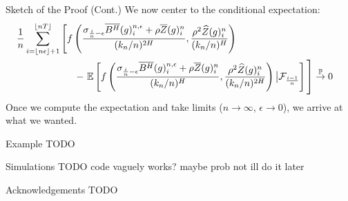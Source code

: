 \documentclass[final,hyperref={pdfpagelabels=false}]{beamer}
\newcommand{\E}{\mathbb{E}}
\begin{document}
\begin{frame}{}
\begin{columns}[t]
      \begin{column}{0.28\linewidth}
        \begin{block}{Sketch of the Proof (Cont.)}
          We now center to the conditional expectation:
          \begin{align*}
            \phantom{}
    &\begin{aligned}
      &\frac{1}{n}\sum_{i = \left\lfloor n\epsilon \right\rfloor + 1}^{\left\lfloor nT \right\rfloor} \left[ \vphantom{\E \left[ f\left( \frac{\sigma_{\frac{i}{n}-\epsilon}\overline{B^H}(g)^{n,\epsilon}_i + \rho\overline{Z}(g)^n_i}{(k_n/n)^{2H}}, \frac{\rho^2\widehat{Z}(g)^n_i}{(k_n/n)^H}\right) \right] } f\left( \frac{\sigma_{\frac{i}{n}-\epsilon}\overline{B^H}(g)^{n,\epsilon}_i + \rho\overline{Z}(g)^n_i}{(k_n/n)^{2H}}, \frac{\rho^2\widehat{Z}(g)^n_i}{(k_n/n)^H}\right) \right. \\ &\hspace*{2.1cm} - \left. \E\left[ f\left( \frac{\sigma_{\frac{i}{n}-\epsilon}\overline{B^H}(g)^{n,\epsilon}_i + \rho\overline{Z}(g)^n_i}{(k_n/n)^{H}}, \frac{\rho^2\widehat{Z}(g)^n_i}{(k_n/n)^{2H}}\right) \big| \mathcal{F}_{\frac{i-1}{n}} \right] \vphantom{\frac{1}{n}\sum_{i = \left\lfloor n\epsilon \right\rfloor + 1}^{\left\lfloor nT \right\rfloor}} \right] \overset{\mathbb{P}}{\rightarrow} 0
    \end{aligned}
          \end{align*}
          Once we compute the expectation and take limits (\(n \rightarrow \infty\), \(\epsilon \rightarrow 0\)), we arrive at what we wanted.
        \end{block}
        \begin{block}{Example}
          TODO
        \end{block}
        \begin{block}{Simulations}
          TODO code vaguely works? maybe prob not ill do it later
        \end{block}
        \begin{block}{Acknowledgements}
          TODO
        \end{block}
      \end{column}
    \end{columns}
  \end{frame}
\end{document}
